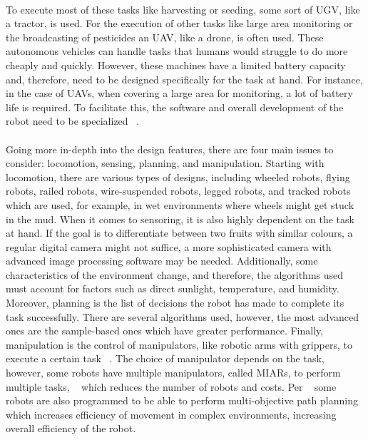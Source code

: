 \paragraph{}To execute most of these tasks like harvesting or seeding, some sort of \gls{UGV}, 
like a tractor, is used. For the execution of other tasks like large area monitoring or the broadcasting 
of pesticides an \gls{UAV}, like a drone, is often used. These autonomous vehicles can handle 
tasks that humans would struggle to do more cheaply and quickly. However, these machines have a limited battery capacity and, 
therefore, need to be designed specifically for the task at hand. For instance, in the case of \gls{UAV}s, 
when covering a large area for monitoring, a lot of battery life is required. To facilitate this, 
the software and overall development of the robot need to be specialized ~\cite{article34, app10103453}.

\paragraph{}Going more in-depth into the design features, there are four main issues to consider: locomotion, sensing, 
planning, and manipulation. Starting with locomotion, there are various types of designs, including wheeled 
robots, flying robots, railed robots, wire-suspended robots, legged robots, and tracked robots which are used, 
for example, in wet environments where wheels might get stuck in the mud. When it comes to sensoring, 
it is also highly dependent on the task at hand. If the goal is to differentiate between two fruits with similar colours, 
a regular digital camera might not suffice, a more sophisticated camera with advanced image processing software may be needed. 
Additionally, some characteristics of the environment change, and therefore, the algorithms used must 
account for factors such as direct sunlight, temperature, and humidity. Moreover, planning is the list of 
decisions the robot has made to complete its task successfully. There are several algorithms used, however, 
the most advanced ones are the sample-based ones which have greater performance. Finally, manipulation is the control of manipulators, 
like robotic arms with grippers, to execute a certain task ~\cite{agriengineering2010010}. The choice of manipulator depends on the task, 
however, some robots have multiple manipulators, called \gls{MIARs}, 
to perform multiple tasks, ~\cite{agriengineering2010010} which reduces the number of robots and costs. Per ~\cite{article34, app10103453} some robots are also programmed 
to be able to perform multi-objective path planning which increases efficiency of movement in complex environments, 
increasing overall efficiency of the robot.

